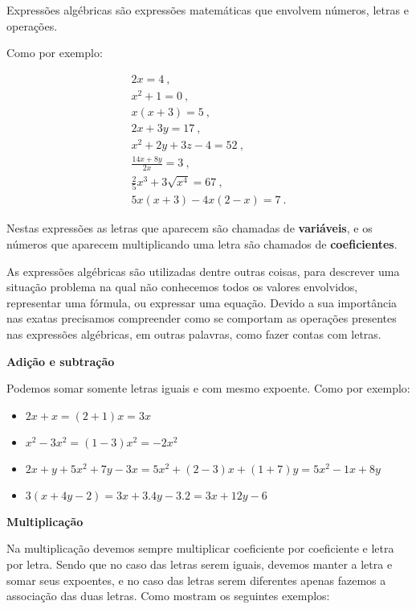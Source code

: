  Expressões algébricas são expressões matemáticas que envolvem números, letras e operações.

 Como por exemplo:

 \begin{eqnarray*}
  2x=4 \ ,\\
  x^2+1=0 \ ,\\
  x(x+3)=5 \ ,\\
  2x+3y=17 \ ,\\
  x^2 + 2y + 3z -4= 52 \ , \\
  \frac{14x + 8y}{2x}= 3 \ , \\
  \frac{2}{5}x^3 + 3\sqrt{x^4}= 67 \ , \\
  5x(x+3)-4x(2-x)=7 \ .
 \end{eqnarray*}

 Nestas expressões as letras que aparecem são chamadas de \textbf{variáveis}, e os números que aparecem multiplicando uma letra são chamados de \textbf{coeficientes}.

 As expressões algébricas são utilizadas dentre outras coisas, para descrever uma situação problema na qual não conhecemos todos os valores envolvidos, representar uma fórmula, ou expressar uma equação. Devido a sua importância nas exatas precisamos compreender como se comportam as operações presentes nas expressões algébricas, em outras palavras, como fazer contas com letras.

 \vskip0.3cm

 \textbf{Adição e subtração}

 Podemos somar somente letras iguais e com mesmo expoente. Como por exemplo:

 \begin{itemize}
  \item $2x + x= (2+1)x= 3x$
  \item $x^2 - 3x^2= (1-3)x^2= -2x^2$
  \item $2x + y + 5x^2 + 7y - 3x= 5x^2 + (2-3)x + (1+7)y= 5x^2 - 1x + 8y$
  \item $3(x+ 4y-2)= 3x + 3.4y - 3.2= 3x + 12y - 6$
 \end{itemize}

  \vskip0.3cm

 \textbf{Multiplicação}

 Na multiplicação devemos sempre multiplicar coeficiente por coeficiente e letra por letra. Sendo que no caso das letras serem iguais, devemos manter a letra e somar seus expoentes, e no caso das letras serem diferentes apenas fazemos a associação das duas letras. Como mostram os seguintes exemplos:

